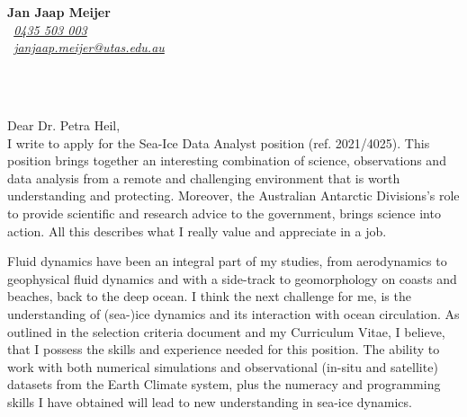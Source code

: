 \documentclass[11pt]{article}
\def\firstname{Jan Jaap}
\def\familyname{Meijer}
\def\FileAuthor{\firstname{ }\familyname}
\begin{document}
\sffamily   %
\hfill%
\begin{minipage}[t]{.6\textwidth}
\raggedleft%
{\bfseries \FileAuthor}\\[.35ex]
\small\itshape%
\Telefon~\href{tel:0061435503003}{0435 503 003}\\
\Letter~\href{mailto:janjaap.meijer@utas.edu.au}{janjaap.meijer@utas.edu.au}
\end{minipage}\\[1em]
%
\\[1em] %
\raggedright
Dear Dr. Petra Heil,\\[1.5em]
%

I write to apply for the Sea-Ice Data Analyst position (ref. 2021/4025). This position brings  together an interesting combination of science, observations and data analysis from a remote and challenging environment that is worth understanding and protecting. Moreover, the Australian Antarctic Divisions’s role to provide scientific and research advice to the government, brings science into action.  All this describes what I really value and appreciate in a job.

Fluid dynamics have been an integral part of my studies, from aerodynamics to geophysical fluid dynamics and with a side-track to geomorphology on coasts and beaches, back to the deep ocean. I think the next challenge for me, is the understanding of (sea-)ice dynamics and its interaction with ocean circulation. As outlined in the selection criteria document and my Curriculum Vitae, I believe, that I possess the skills and experience needed for this position. The ability to work with both numerical simulations and observational (in-situ and satellite) datasets from the Earth Climate system, plus the numeracy and programming skills I have obtained will lead to new understanding in sea-ice dynamics.
\end{document}

